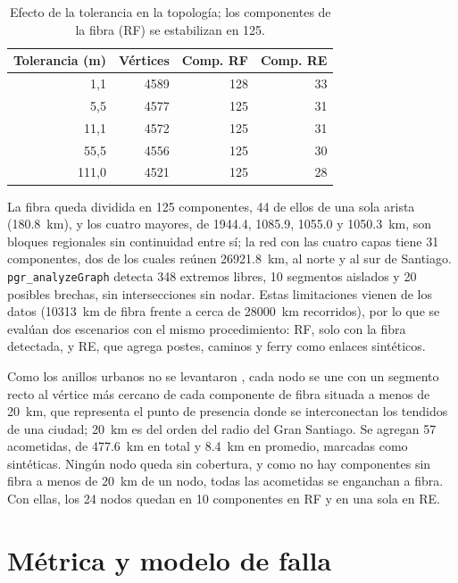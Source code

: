 \documentclass[conference]{IEEEtran}
\begin{document}
\begin{table}[t]
\centering
\caption{Efecto de la tolerancia en la topología; los componentes de la fibra (RF) se estabilizan en 125.}
\label{tab:tolerancia}
\footnotesize
\begin{tabular}{@{}rrrr@{}}
\toprule
Tolerancia (m) & Vértices & Comp. RF & Comp. RE \\
\midrule
1,1 & \num{4589} & 128 & 33 \\
5,5 & \num{4577} & 125 & 31 \\
11,1 & \num{4572} & 125 & 31 \\
55,5 & \num{4556} & 125 & 30 \\
111,0 & \num{4521} & 125 & 28 \\
\bottomrule
\end{tabular}
\end{table}

La fibra queda dividida en 125 componentes, 44 de ellos de una sola arista (\SI{180,8}{km}), y los cuatro mayores, de \num{1944,4}, \num{1085,9}, \num{1055,0} y \SI{1050,3}{km}, son bloques regionales sin continuidad entre sí; la red con las cuatro capas tiene 31 componentes, dos de los cuales reúnen \SI{26921,8}{km}, al norte y al sur de Santiago.
\texttt{pgr\_analyzeGraph} detecta 348 extremos libres, 10 segmentos aislados y 20 posibles brechas, sin intersecciones sin nodar.
Estas limitaciones vienen de los datos (\SI{10313}{km} de fibra frente a cerca de \SI{28000}{km} recorridos), por lo que se evalúan dos escenarios con el mismo procedimiento: RF, solo con la fibra detectada, y RE, que agrega postes, caminos y ferry como enlaces sintéticos.

Como los anillos urbanos no se levantaron \cite{niclabs2018}, cada nodo se une con un segmento recto al vértice más cercano de cada componente de fibra situada a menos de \SI{20}{km}, que representa el punto de presencia donde se interconectan los tendidos de una ciudad; \SI{20}{km} es del orden del radio del Gran Santiago.
Se agregan 57 acometidas, de \SI{477,6}{km} en total y \SI{8,4}{km} en promedio, marcadas como sintéticas.
Ningún nodo queda sin cobertura, y como no hay componentes sin fibra a menos de \SI{20}{km} de un nodo, todas las acometidas se enganchan a fibra.
Con ellas, los 24 nodos quedan en 10 componentes en RF y en una sola en RE.

\section{Métrica y modelo de falla}
\label{sec:modelo}
\end{document}
